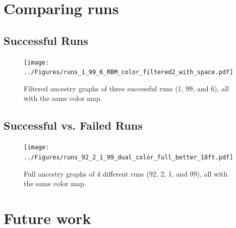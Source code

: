 \documentclass{sig-alternate}
\begin{document}
\section{Comparing runs}
\label{sec:comparisons}

\subsection{Successful Runs}
\begin{figure}[tb]
	\begin{center}
		\texttt{[image: ../Figures/runs\_1\_99\_6\_RBM\_color\_filtered2\_with\_space.pdf]}
	\end{center}
	\caption{Filtered ancestry graphs of three successful runs (1, 99, and 6), all with the same color map.}
	\label{fig:runs1:99:6:filtered}
\end{figure}


\subsection{Successful vs. Failed Runs}
\begin{figure}[tb]
	\begin{center}
		\texttt{[image: ../Figures/runs\_92\_2\_1\_99\_dual\_color\_full\_better\_18ft.pdf]}
	\end{center}
	\caption{Full ancestry graphs of 4 different runs (92, 2, 1, and 99), all with the same color map.}
	\label{fig:runs92:2:1:99:filtered}
\end{figure}

\section{Future work}
\label{sec:futurework}
\end{document}

